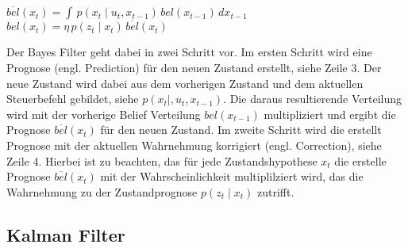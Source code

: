 
\begin{algorithm}
\begin{onehalfspacing}
	\DontPrintSemicolon
	{
		{
			$\overline{bel}(x_t) = \int \, p(x_t \mid u_t, x_{t-1}) \, bel(x_{t-1}) \, dx_{t-1}$\;
			$bel(x_t) = \eta \, p(z_t \mid x_t) \, \overline{bel}(x_t)$\;
		}
	}
\label{alg:algorithm_bayes_filter}
\end{onehalfspacing}
\end{algorithm}

Der Bayes Filter geht dabei in zwei Schritt vor. Im ersten Schritt wird eine Prognose (engl. Prediction) für den neuen Zustand erstellt, siehe Zeile 3. Der neue Zustand wird dabei aus dem vorherigen Zustand und dem aktuellen Steuerbefehl gebildet, siehe $p(x_t \mid, u_t, x_{t-1})$. Die daraus resultierende Verteilung wird mit der vorherige Belief Verteilung $bel(x_{t-1})$ multipliziert und ergibt die Prognose $\overline{bel}(x_t)$ für den neuen Zustand. Im zweite Schritt wird die erstellt Prognose mit der aktuellen Wahrnehmung korrigiert (engl. Correction), siehe Zeile 4. Hierbei ist zu beachten, das für jede Zustandshypothese $x_t$ die erstelle Prognose $\overline{bel}(x_t)$ mit der Wahrscheinlichkeit multiplilziert wird, das die Wahrnehmung zu der Zustandprognose \mbox{$p(z_t \mid x_t)$} zutrifft.


%
%
\subsection{Kalman Filter}


